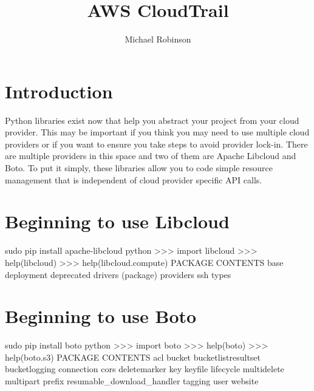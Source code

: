 
\title{AWS CloudTrail}

\author{Michael Robinson}


\renewcommand{\shortauthors}{M. Robinson}


\begin{abstract}

\end{abstract}


\maketitle

\section{Introduction}

Python libraries exist now that help you abstract your project from your cloud provider. This may be important if you think you may need to use multiple cloud providers or if you want to ensure you take steps to avoid provider lock-in. There are multiple providers in this space and two of them are Apache Libcloud and Boto. To put it simply, these libraries allow you to code simple resource management that is independent of cloud provider specific API calls. 

\section{Beginning to use Libcloud}

sudo pip install apache-libcloud
python
>>> import libcloud
>>> help(libcloud)
>>> help(libcloud.compute)
PACKAGE CONTENTS
    base
    deployment
    deprecated
    drivers (package)
    providers
    ssh
    types

\section{Beginning to use Boto}

sudo pip install boto
python
>>> import boto
>>> help(boto)
>>> help(boto.s3)
PACKAGE CONTENTS
    acl
    bucket
    bucketlistresultset
    bucketlogging
    connection
    cors
    deletemarker
    key
    keyfile
    lifecycle
    multidelete
    multipart
    prefix
    resumable_download_handler
    tagging
    user
    website

